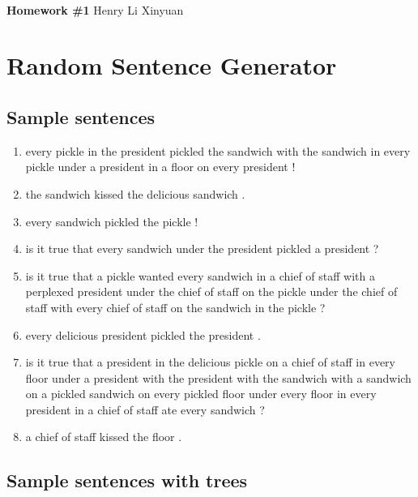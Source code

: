 \documentclass[11pt]{article}
\begin{document}
\\
{{\bf Homework \#1}} \hfill {Henry Li Xinyuan} \\

\section{Random Sentence Generator}

\subsection{Sample sentences}

\begin{enumerate}[label=(\arabic*)]
      \item every pickle in the president pickled the sandwich with the sandwich in every pickle under a president in a floor on every president !
      \item the sandwich kissed the delicious sandwich .
      \item every sandwich pickled the pickle !
      \item is it true that every sandwich under the president pickled a president ?
      \item is it true that a pickle wanted every sandwich in a chief of staff with a perplexed president under the chief of staff on the pickle under the chief of staff with every chief of staff on the sandwich in the pickle ?
      \item every delicious president pickled the president .
      \item is it true that a president in the delicious pickle on a chief of staff in every floor under a president with the president with the sandwich with a sandwich on a pickled sandwich on every pickled floor under every floor in every president in a chief of staff ate every sandwich ?
      \item a chief of staff kissed the floor .
\end{enumerate}

\subsection{Sample sentences with trees}
\subsubsection{}
\end{document}
